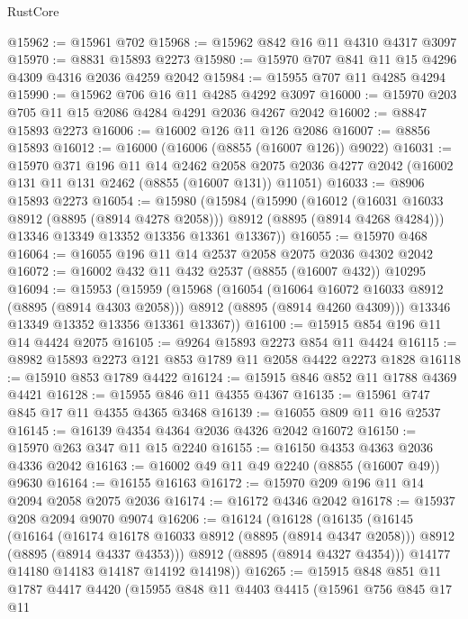 \begin{lexlean}{RustCore}
\begin{coremodule}
@15962 := @15961 @702
@15968 := @15962 @842 @16 @11 @4310 @4317 @3097
@15970 := @8831 @15893 @2273
@15980 := @15970 @707 @841 @11 @15 @4296 @4309 @4316 @2036 @4259 @2042
@15984 := @15955 @707 @11 @4285 @4294
@15990 := @15962 @706 @16 @11 @4285 @4292 @3097
@16000 := @15970 @203 @705 @11 @15 @2086 @4284 @4291 @2036 @4267 @2042
@16002 := @8847 @15893 @2273
@16006 := @16002 @126 @11 @126 @2086
@16007 := @8856 @15893
@16012 := @16000 (@16006 (@8855 (@16007 @126)) @9022)
@16031 := @15970
    @371
    @196
    @11
    @14
    @2462
    @2058
    @2075
    @2036
    @4277
    @2042
    (@16002 @131 @11 @131 @2462 (@8855 (@16007 @131)) @11051)
@16033 := @8906 @15893 @2273
@16054 := @15980
    (@15984
      (@15990
        (@16012 (@16031 @16033 @8912 (@8895 (@8914 @4278 @2058))) @8912 (@8895 (@8914 @4268 @4284)))
        @13346
        @13349
        @13352
        @13356
        @13361
        @13367))
@16055 := @15970 @468
@16064 := @16055 @196 @11 @14 @2537 @2058 @2075 @2036 @4302 @2042
@16072 := @16002 @432 @11 @432 @2537 (@8855 (@16007 @432)) @10295
@16094 := @15953
    (@15959
      (@15968
        (@16054
          (@16064 @16072 @16033 @8912 (@8895 (@8914 @4303 @2058)))
          @8912
          (@8895 (@8914 @4260 @4309)))
        @13346
        @13349
        @13352
        @13356
        @13361
        @13367))
@16100 := @15915 @854 @196 @11 @14 @4424 @2075
@16105 := @9264 @15893 @2273 @854 @11 @4424
@16115 := @8982 @15893 @2273 @121 @853 @1789 @11 @2058 @4422 @2273 @1828
@16118 := @15910 @853 @1789 @4422
@16124 := @15915 @846 @852 @11 @1788 @4369 @4421
@16128 := @15955 @846 @11 @4355 @4367
@16135 := @15961 @747 @845 @17 @11 @4355 @4365 @3468
@16139 := @16055 @809 @11 @16 @2537
@16145 := @16139 @4354 @4364 @2036 @4326 @2042 @16072
@16150 := @15970 @263 @347 @11 @15 @2240
@16155 := @16150 @4353 @4363 @2036 @4336 @2042
@16163 := @16002 @49 @11 @49 @2240 (@8855 (@16007 @49)) @9630
@16164 := @16155 @16163
@16172 := @15970 @209 @196 @11 @14 @2094 @2058 @2075 @2036
@16174 := @16172 @4346 @2042
@16178 := @15937 @208 @2094 @9070 @9074
@16206 := @16124
    (@16128
      (@16135
        (@16145
          (@16164
            (@16174 @16178 @16033 @8912 (@8895 (@8914 @4347 @2058)))
            @8912
            (@8895 (@8914 @4337 @4353)))
          @8912
          (@8895 (@8914 @4327 @4354)))
        @14177
        @14180
        @14183
        @14187
        @14192
        @14198))
@16265 := @15915
    @848
    @851
    @11
    @1787
    @4417
    @4420
    (@15955
      @848
      @11
      @4403
      @4415
      (@15961
        @756
        @845
        @17
        @11

\end{coremodule}
\end{lexlean}
